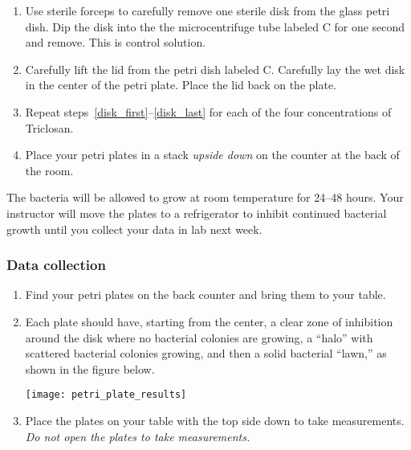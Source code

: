 \documentclass[12pt]{exam}
\begin{document}
\begin{questions}
\begin{enumerate}
		\item \label{disk_first} Use sterile forceps to carefully remove one sterile disk from the glass petri dish. Dip the disk into the the microcentrifuge tube labeled C for one second and remove. This is control solution.
		
		\item \label{disk_last} Carefully lift the lid from the petri dish labeled C. Carefully lay the wet disk in the center of the petri plate. Place the lid back on the plate.


		\item Repeat steps~\ref{disk_first}–\ref{disk_last} for each of the four concentrations of Triclosan.
		
		\item Place your petri plates in a stack \emph{upside down} on the counter at the back of the room.
		
	\end{enumerate}

The bacteria will be allowed to grow at room temperature for 24–48 hours. Your instructor will move the plates to a refrigerator to inhibit continued bacterial growth until you collect your data in lab next week.

\subsubsection*{Data collection}

\begin{enumerate}

	\item Find your petri plates on the back counter and bring them to your table.
	
	\item Each plate should have, starting from the center, a clear zone of inhibition around the disk where no bacterial colonies are growing, a “halo” with scattered bacterial colonies growing, and then a solid bacterial “lawn,” as shown in the figure below.
	
		{\centering\texttt{[image: petri\_plate\_results]}\par
		}

	\item Place the plates on your table with the top side down to take measurements. \emph{Do not open the plates to take measurements.}
	

\end{enumerate}
\end{questions}
\end{document}
